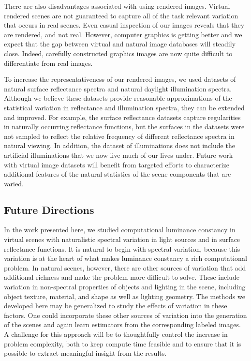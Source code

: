 \documentclass{jov}
\begin{document}
There are also disadvantages associated with using rendered images. 
Virtual rendered scenes are not guaranteed to capture all of the task relevant variation that occurs in real scenes.
Even casual inspection of our images reveals that they are rendered, and not real.
However, computer graphics is getting better and we expect that the gap between virtual and natural image databases will steadily close.
Indeed, carefully constructed graphics images are now quite difficult to differentiate from real images.

To increase the representativeness of our rendered images, we used datasets of  natural surface reflectance spectra and natural daylight illumination spectra.
Although we believe these datasets provide reasonable approximations of the statistical variation in reflectance and illumination spectra, they can be extended and improved.
For example, the surface reflectance datasets capture regularities in naturally occurring reflectance functions, but the surfaces in the datasets were not sampled to reflect the relative frequency of different reflectance spectra in natural viewing. 
In addition, the dataset of illuminations does not include the artificial illuminations that we now live much of our lives under.
Future work with virtual image datasets will benefit from targeted efforts to characterize additional features of the natural statistics of the scene components that are varied.

\subsection{Future Directions}
In the work presented here, we studied computational luminance constancy in virtual scenes with naturalistic spectral variation in light sources and in surface reflectance functions. 
It is natural to begin with spectral variation, because this variation is at the heart of what makes luminance constancy a rich computational problem.
In natural scenes, however, there are other sources of variation that add additional richness and make the problem more difficult to solve.
These include variation in non-spectral properties of objects and lighting in the scene, including object texture, material, and shape as well as lighting geometry. 
The methods we developed here may be generalized to study the effects of variation in these factors.
One could incorporate these other sources of variation into the generation of the scenes and again learn estimators from the corresponding labeled images. 
A challenge for this approach will be to thoughtfully control the increase in problem complexity, both to keep compute time feasible and to ensure that it is possible to extract meaningful insight from the results.
\end{document}
